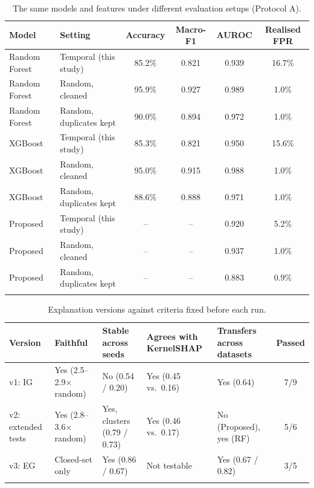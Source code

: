 \documentclass[pdflatex,sn-mathphys-num,iicol]{sn-jnl}%
\begin{document}
\begin{appendices}
\begin{table}[!htbp]
\caption{The same models and features under different evaluation setups (Protocol A).}\label{tab:A2}
\footnotesize
\begin{tabular}{@{}llcccc@{}}
\toprule
Model & Setting & Accuracy & Macro-F1 & AUROC & Realised FPR \\
\midrule
Random Forest & Temporal (this study) & 85.2\% & 0.821 & 0.939 & 16.7\% \\
Random Forest & Random, cleaned & 95.9\% & 0.927 & 0.989 & 1.0\% \\
Random Forest & Random, duplicates kept & 90.0\% & 0.894 & 0.972 & 1.0\% \\
XGBoost & Temporal (this study) & 85.3\% & 0.821 & 0.950 & 15.6\% \\
XGBoost & Random, cleaned & 95.0\% & 0.915 & 0.988 & 1.0\% \\
XGBoost & Random, duplicates kept & 88.6\% & 0.888 & 0.971 & 1.0\% \\
Proposed & Temporal (this study) & -- & -- & 0.920 & 5.2\% \\
Proposed & Random, cleaned & -- & -- & 0.937 & 1.0\% \\
Proposed & Random, duplicates kept & -- & -- & 0.883 & 0.9\% \\
\botrule
\end{tabular}
\end{table}

\begin{table}[!htbp]
\caption{Explanation versions against criteria fixed before each run.}\label{tab:A3}
\footnotesize
\begin{tabular}{@{}L{2.5cm}L{2.6cm}L{2.7cm}L{2.4cm}L{2.7cm}c@{}}
\toprule
Version & Faithful & Stable across seeds & Agrees with KernelSHAP & Transfers across datasets & Passed \\
\midrule
v1: IG & Yes (2.5--2.9$\times$ random) & No (0.54 / 0.20) & Yes (0.45 vs.\ 0.16) & Yes (0.64) & 7/9 \\
v2: extended tests & Yes (2.8--3.6$\times$ random) & Yes, clusters (0.79 / 0.73) & Yes (0.46 vs.\ 0.17) & No (Proposed), yes (RF) & 5/6 \\
v3: EG & Closed-set only & Yes (0.86 / 0.67) & Not testable & Yes (0.67 / 0.82) & 3/5 \\
\botrule
\end{tabular}
\end{table}


\end{appendices}
\end{document}
